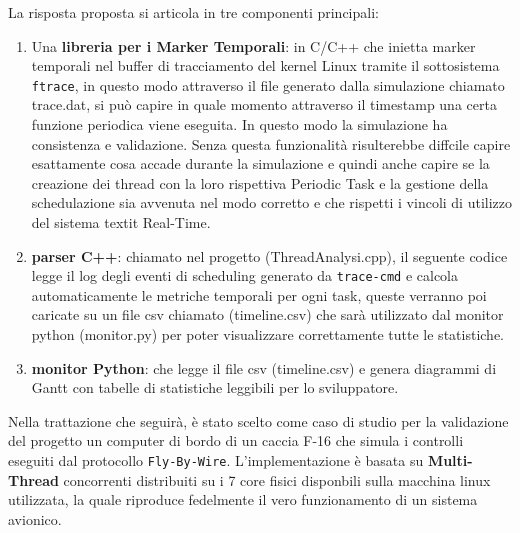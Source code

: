 La risposta proposta si articola in tre componenti principali:
\begin{enumerate}
	\item Una \textbf{libreria per i Marker Temporali}: in C/C++ che inietta marker temporali nel buffer di tracciamento del kernel Linux tramite il sottosistema \texttt{ftrace}, in questo modo attraverso il file generato dalla simulazione chiamato trace.dat, si può capire in quale momento attraverso il timestamp una certa funzione periodica viene eseguita. In questo modo la simulazione ha consistenza e validazione. Senza questa funzionalità risulterebbe diffcile capire esattamente cosa accade durante la simulazione e quindi anche capire se la creazione dei thread con la loro rispettiva Periodic Task e la gestione della schedulazione sia avvenuta nel modo corretto e che rispetti i vincoli di utilizzo del sistema textit{ Real-Time}.
	\item  \textbf{parser C++}: chiamato nel progetto (ThreadAnalysi.cpp), il seguente codice legge il log degli eventi di scheduling generato da \texttt{trace-cmd}  e calcola automaticamente le metriche temporali per ogni task, queste verranno poi caricate su un file csv chiamato (timeline.csv) che sarà utilizzato dal monitor python (monitor.py) per poter visualizzare correttamente tutte le statistiche.
	\item  \textbf{monitor Python}: che legge il file csv (timeline.csv) e genera diagrammi di Gantt con tabelle di statistiche leggibili per lo sviluppatore.
\end{enumerate}

Nella trattazione che seguirà, è stato scelto come caso di studio per la validazione del progetto un computer di bordo di un caccia F-16 che simula i controlli eseguiti dal protocollo \texttt{Fly-By-Wire}. L'implementazione è basata su  \textbf{Multi-Thread} concorrenti distribuiti su i 7 core fisici disponbili sulla macchina linux utilizzata, la quale riproduce fedelmente il vero funzionamento di un sistema avionico.

